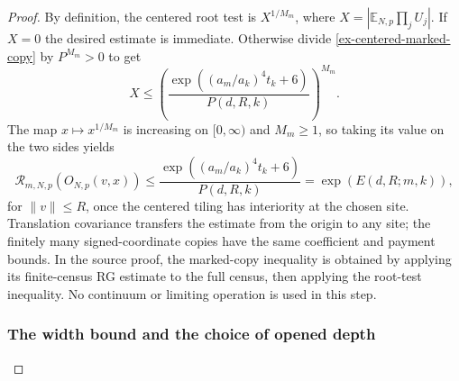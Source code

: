 \begin{proof}
By definition, the centered root test is $X^{1/M_m}$, where $X=|\mathbb E_{N,p}\prod_j U_j|$. If $X=0$ the desired estimate is immediate. Otherwise divide \eqref{ex-centered-marked-copy} by $P^{M_m}>0$ to get
\[
 X\leq\left(\frac{\exp((a_m/a_k)^4t_k+6)}{P(d,R,k)}\right)^{M_m}.
\]
The map $x\mapsto x^{1/M_m}$ is increasing on $[0,\infty)$ and $M_m\geq1$, so taking its value on the two sides yields
\begin{equation}\label{ex-centered-opened-root}
 \mathcal R_{m,N,p}(O_{N,p}(v,x))
 \leq \frac{\exp((a_m/a_k)^4t_k+6)}{P(d,R,k)}
 =\exp(E(d,R;m,k)),
\end{equation}
for $\|v\|\leq R$, once the centered tiling has interiority at the chosen site. Translation covariance transfers the estimate from the origin to any site; the finitely many signed-coordinate copies have the same coefficient and payment bounds. In the source proof, the marked-copy inequality is obtained by applying its finite-census RG estimate to the full census, then applying the root-test inequality. No continuum or limiting operation is used in this step.

\subsubsection{The width bound and the choice of opened depth}


\end{proof}
